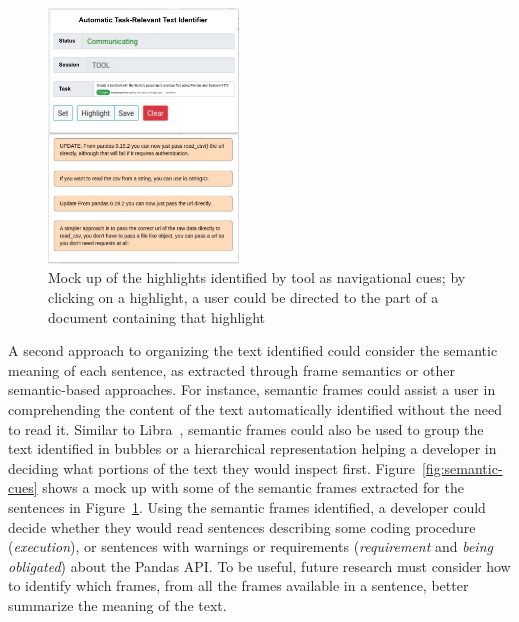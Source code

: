 \begin{figure}[H]
    \centering
    \includegraphics[width=0.45\textwidth]{fig/cp7/navigational-cues}
    \caption{Mock up of the highlights identified by \acs{tool} as navigational cues; by clicking on a highlight, a user could be directed to the part of a document containing that highlight}
    \label{fig:navigational-cues}
\end{figure}



A second approach to organizing the text identified could consider 
the semantic meaning of each sentence, as extracted through frame semantics or other semantic-based approaches. 
For instance, semantic frames could 
assist a user in comprehending the content of the text automatically identified
without the need to read it. 
Similar to Libra~\cite{Ponzanelli2017}, semantic frames could also be used to group the text identified in bubbles or a hierarchical representation 
 helping a developer
in deciding what portions of the text they would inspect first. 
Figure~\ref{fig:semantic-cues} shows a mock up 
with some of the semantic frames extracted 
for the sentences in Figure~\ref{fig:navigational-cues}.
Using the semantic frames identified,
a developer could decide whether they would read sentences 
describing some coding procedure (\textit{execution}), or sentences 
with warnings or requirements (\textit{requirement} and \textit{being obligated})
about the Pandas API. 
To be useful, future research must consider how to identify 
which frames, from all the frames available in a sentence, 
better summarize the meaning of the text. 







